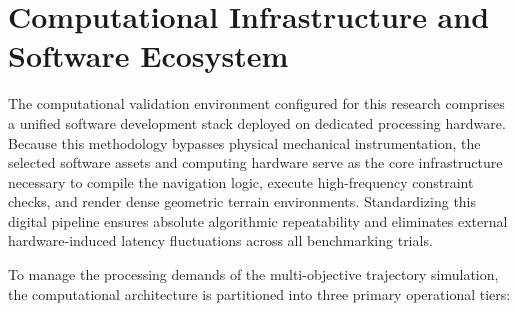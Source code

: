 \section{Computational Infrastructure and Software Ecosystem}

The computational validation environment configured for this research comprises a unified software
development stack deployed on dedicated processing hardware. Because this methodology bypasses
physical mechanical instrumentation, the selected software assets and computing hardware serve as
the core infrastructure necessary to compile the navigation logic, execute high-frequency constraint
checks, and render dense geometric terrain environments. Standardizing this digital pipeline ensures
absolute algorithmic repeatability and eliminates external hardware-induced latency fluctuations
across all benchmarking trials.

To manage the processing demands of the multi-objective trajectory simulation, the computational
architecture is partitioned into three primary operational tiers:

